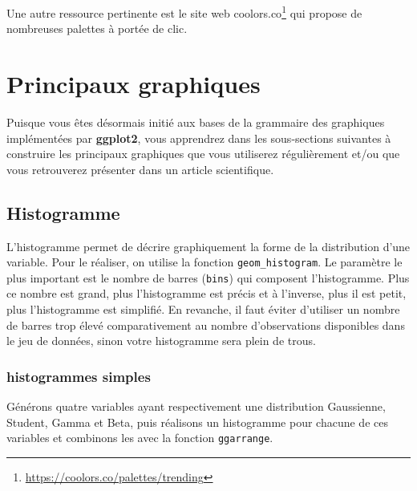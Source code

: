 \documentclass[
  11pt,
  french,
]{book}
\makeatletter
\renewcommand{\href}[2]{#2\footnote{\url{#1}}}
\newenvironment{kframev}{%
\medskip{}
\setlength{\fboxsep}{.8em}
 \def\at@end@of@kframev{}%
 \ifinner\ifhmode%
  \def\at@end@of@kframev{\end{minipage}}%
  \begin{minipage}{\columnwidth}%
 \fi\fi%
 \def\FrameCommand##1{\hskip\@totalleftmargin \hskip-\fboxsep
 \colorbox{shadebluecolor}{##1}\hskip-\fboxsep
     \hskip-\linewidth \hskip-\@totalleftmargin \hskip\columnwidth}%
 \MakeFramed {\advance\hsize-\width
   \@totalleftmargin\z@ \linewidth\hsize
   \@setminipage}}%
 {\par\unskip\endMakeFramed%
 \at@end@of@kframev}
\newenvironment{rmdblock}[1]
  {
  \begin{itemize}
  \renewcommand{\labelitemi}{
    \raisebox{-.7\height}[0pt][0pt]{
      {\setkeys{Gin}{width=3em,keepaspectratio}\texttt{[image: images/\#1]}}
    }
  }
  \setlength{\fboxsep}{1em}
  \begin{kframev}
  \small
  \item
  }
  {
  \end{kframev}
  \end{itemize}
  }
\newenvironment{bloc_objectif}
  {\begin{rmdblock}{objectif}}
  {\end{rmdblock}}
\makeatother
\begin{document}
Une autre ressource pertinente est le site web \href{https://coolors.co/palettes/trending}{coolors.co} qui propose de nombreuses palettes à portée de clic.

\hypertarget{sect032}{%
\section{Principaux graphiques}\label{sect032}}

\begin{bloc_objectif}

Puisque vous êtes désormais initié aux bases de la grammaire des graphiques implémentées par \textbf{ggplot2}, vous apprendrez dans les sous-sections suivantes à construire les principaux graphiques que vous utiliserez régulièrement et/ou que vous retrouverez présenter dans un article scientifique.

\end{bloc_objectif}

\hypertarget{sect0321}{%
\subsection{Histogramme}\label{sect0321}}

L'histogramme permet de décrire graphiquement la forme de la distribution d'une variable. Pour le réaliser, on utilise la fonction \texttt{geom\_histogram}. Le paramètre le plus important est le nombre de barres (\texttt{bins}) qui composent l'histogramme. Plus ce nombre est grand, plus l'histogramme est précis et à l'inverse, plus il est petit, plus l'histogramme est simplifié. En revanche, il faut éviter d'utiliser un nombre de barres trop élevé comparativement au nombre d'observations disponibles dans le jeu de données, sinon votre histogramme sera plein de trous.

\hypertarget{sect03211}{%
\subsubsection{histogrammes simples}\label{sect03211}}

Générons quatre variables ayant respectivement une distribution Gaussienne, Student, Gamma et Beta, puis réalisons un histogramme pour chacune de ces variables et combinons les avec la fonction \texttt{ggarrange}.
\end{document}
